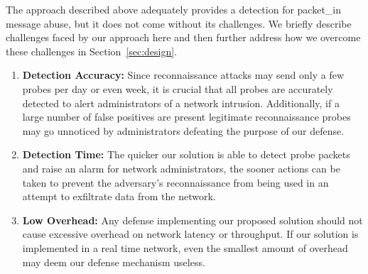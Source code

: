 The approach described above adequately provides a detection for
packet\_in message abuse, but it does not come without its challenges.
We briefly describe challenges faced by our approach here and then 
further address how we overcome these challenges in 
Section~\ref{sec:design}.

\begin{enumerate}
  \item \textbf{Detection Accuracy:} Since reconnaissance attacks may
    send only a few probes per day or even week, it is crucial that all
    probes are accurately detected to alert administrators of a network 
    intrusion. Additionally, if a large number of false positives are 
    present legitimate reconnaissance probes may go unnoticed by 
    administrators defeating the purpose of our defense.
  \item \textbf{Detection Time:} The quicker our solution is able to
    detect probe packets and raise an alarm for network administrators,
    the sooner actions can be taken to prevent the adversary's
    reconnaissance from being used in an attempt to exfiltrate data from
    the network.
  \item \textbf{Low Overhead:} Any defense implementing our proposed
    solution should not cause excessive overhead on network latency or
    throughput. If our solution is implemented in a real time network,
    even the smallest amount of overhead may deem our defense mechanism
    useless.
\end{enumerate}
